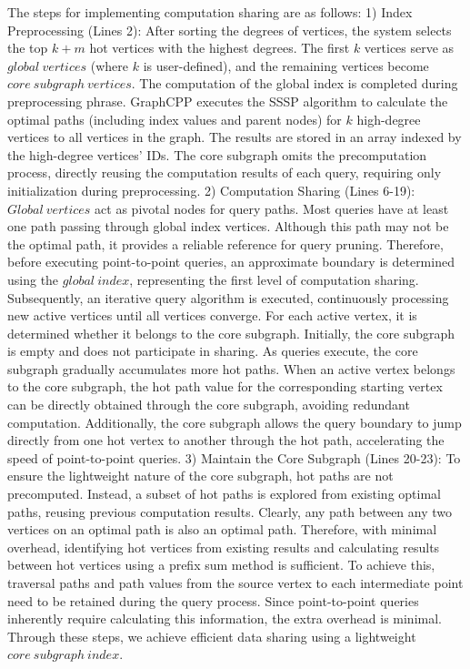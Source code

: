 \documentclass[lettersize,journal]{IEEEtran} %
\begin{document}
The steps for implementing computation sharing are as follows:
1) Index Preprocessing (Lines 2): After sorting the degrees of vertices, the system selects the top $k+m$ hot vertices with the highest degrees. The first $k$ vertices serve as $global~vertices$ (where $k$ is user-defined), and the remaining vertices become $core~subgraph~vertices$. The computation of the global index is completed during preprocessing phrase. GraphCPP executes the SSSP algorithm to calculate the optimal paths (including index values and parent nodes) for $k$ high-degree vertices to all vertices in the graph. The results are stored in an array indexed by the high-degree vertices' IDs. The core subgraph omits the precomputation process, directly reusing the computation results of each query, requiring only initialization during preprocessing.
2) Computation Sharing (Lines 6-19): $Global~vertices$ act as pivotal nodes for query paths. Most queries have at least one path passing through global index vertices. Although this path may not be the optimal path, it provides a reliable reference for query pruning. Therefore, before executing point-to-point queries, an approximate boundary is determined using the $global~index$, representing the first level of computation sharing. Subsequently, an iterative query algorithm is executed, continuously processing new active vertices until all vertices converge. For each active vertex, it is determined whether it belongs to the core subgraph. Initially, the core subgraph is empty and does not participate in sharing. As queries execute, the core subgraph gradually accumulates more hot paths. When an active vertex belongs to the core subgraph, the hot path value for the corresponding starting vertex can be directly obtained through the core subgraph, avoiding redundant computation. Additionally, the core subgraph allows the query boundary to jump directly from one hot vertex to another through the hot path, accelerating the speed of point-to-point queries.
3) Maintain the Core Subgraph (Lines 20-23): To ensure the lightweight nature of the core subgraph, hot paths are not precomputed. Instead, a subset of hot paths is explored from existing optimal paths, reusing previous computation results. Clearly, any path between any two vertices on an optimal path is also an optimal path. Therefore, with minimal overhead, identifying hot vertices from existing results and calculating results between hot vertices using a prefix sum method is sufficient. To achieve this, traversal paths and path values from the source vertex to each intermediate point need to be retained during the query process. Since point-to-point queries inherently require calculating this information, the extra overhead is minimal. Through these steps, we achieve efficient data sharing using a lightweight $core~subgraph~index$.
\end{document}
